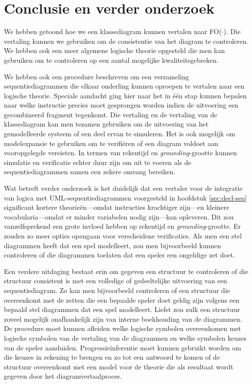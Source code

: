 \chapter{Conclusie en verder onderzoek}\label{sec:conclusie}
We hebben getoond hoe we een klassediagram kunnen vertalen naar FO($\cdot$). Die vertaling kunnen we gebruiken om de consistentie van het diagram te controleren. We hebben ook een meer algemene logische theorie opgesteld die men kan gebruiken om te controleren op een aantal mogelijke kwaliteitsgebreken.

We hebben ook een procedure beschreven om een verzameling sequentiediagrammen die elkaar onderling kunnen oproepen te vertalen naar een logische theorie. Speciale aandacht ging hier naar het in \'e\'en stap kunnen bepalen naar welke instructie precies moet gesprongen worden indien de uitvoering een gecombineerd fragment tegenkomt. Die vertaling en de vertaling van de klassediagram kan men tezamen gebruiken om de uitvoering van het gemodelleerde systeem of een deel ervan te simuleren. Het is ook mogelijk om modelexpansie te gebruiken om te verifi\"eren of een diagram voldoet aan vooropgelegde vereisten. In termen van rekentijd en \textit{grounding}-grootte kunnen simulatie en verificatie echter duur zijn om uit te voeren als de sequentiediagrammen samen een zekere omvang bereiken.

Wat betreft verder onderzoek is het duidelijk dat een vertaler voor de integratie van logica met UML-sequentiediagrammen voorgesteld in hoofdstuk \ref{sec:decl-seq} significant kortere theorie\"en---omdat instructies krachtiger zijn---en kleinere vocabularia---omdat er minder variabelen nodig zijn---kan opleveren. Dit zou vanzelfsprekend een grote invloed hebben op rekentijd en \textit{grounding}-grootte. Er zouden zo meer opties opengaan voor verscheidene verificaties. Als men een stel diagrammen heeft dat een spel modelleert, zou men bijvoorbeeld kunnen controleren of die diagrammen toelaten dat een speler een ongeldige zet doet.

Een verdere uitdaging bestaat erin om gegeven een structuur te controleren of die structuur consistent is met een volledige of gedeeltelijke uitvoering van een sequentiediagram. Zo kan men bijvoorbeeld controleren of een structuur die overeenkomt met de zetten die een bepaalde speler doet geldig zijn volgens een bepaald stel diagrammen dat een spel modelleert. Liefst zou zulk een structuur zoveel mogelijk onafhankelijk zijn van interne boekhouding van de diagrammen. De procedure moet kunnen afleiden welke logische symbolen overeenkomen met logische symbolen van de vertaling van de diagrammen en welke symbolen keuzes van de speler aanduiden. Progressie\"inferentie moet kunnen gebruikt worden om die keuzes in rekening te brengen en zo tot een antwoord te komen of de structuur overeenkomt met een model voor de theorie die als resultaat wordt gegeven door het diagramvertaalproces.